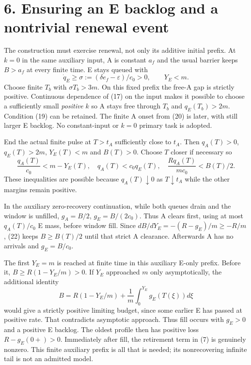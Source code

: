 \documentclass[11pt,a4paper]{article}
\begin{document}
\newpage
\section*{6. Ensuring an E backlog and a nontrivial renewal event}

The construction must exercise renewal, not only its additive initial
prefix. At $k=0$ in the same auxiliary input, A is constant $a_f$ and
the usual barrier keeps $B>a_f$ at every finite time. E stays queued with
\begin{equation}
 \dot q_E\geq\sigma:=(\delta e_f-\varepsilon)/c_0>0,
 \qquad Y_E<m. \tag{21}
\end{equation}
Choose finite $T_b$ with $\sigma T_b>3m$. On this fixed prefix the free-A
gap is strictly positive. Continuous dependence of (17) on the input makes
it possible to choose a sufficiently small \emph{positive} $k$ so A stays
free through $T_b$ and $q_E(T_b)>2m$. Condition (19) can be retained.
The finite A onset from (20) is later, with still larger E backlog.
No constant-input or $k=0$ primary task is adopted.

End the actual finite pulse at $T>t_A$ sufficiently close to $t_A$.
Then $q_A(T)>0$, $q_E(T)>2m$, $Y_E(T)<m$ and $B(T)>0$.
Choose $T$ closer if necessary so
\begin{equation}
 \frac{q_A(T)}{c_0}<m-Y_E(T),\quad
 q_A(T)<c_0q_E(T),\quad
 \frac{R q_A(T)}{mc_0}<B(T)/2. \tag{22}
\end{equation}
These inequalities are possible because $q_A(T)\downarrow0$ as
$T\downarrow t_A$ while the other margins remain positive.

In the auxiliary zero-recovery continuation, while both queues drain and
the window is unfilled, $g_A=B/2$, $g_E=B/(2c_0)$. Thus A clears first,
using at most $q_A(T)/c_0$ E mass, before window fill. Since
$dB/dY_E=-(R-g_E)/m\geq-R/m$, (22) keeps $B\geq B(T)/2$ until
that strict A clearance. Afterwards A has no arrivals and $g_E=B/c_0$.

The first $Y_E=m$ is reached at finite time in this auxiliary E-only
prefix. Before it, $B\geq R(1-Y_E/m)>0$. If $Y_E$ approached $m$
only asymptotically, the additional identity
\begin{equation}
 B=R(1-Y_E/m)+\frac1m\int_0^{Y_E}g_E(T(\xi))d\xi \tag{23}
\end{equation}
would give a strictly positive limiting budget, since some earlier E has
passed at positive rate. That contradicts asymptotic approach. Thus fill
occurs with $g_E>0$ and a positive E backlog. The oldest profile then has
positive loss $R-g_E(0+)>0$. Immediately after fill, the retirement term
in (7) is genuinely nonzero. This finite auxiliary prefix is all that is
needed; its nonrecovering infinite tail is not an admitted model.
\end{document}
